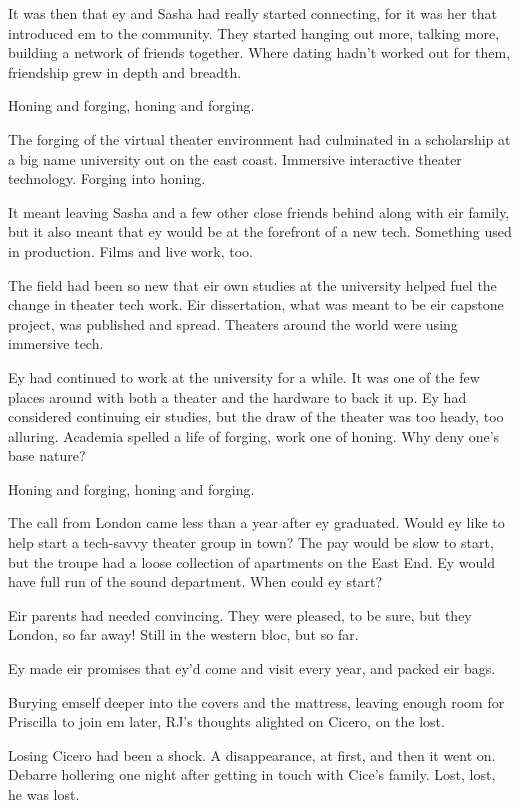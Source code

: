 It was then that ey and Sasha had really started connecting, for it was her that introduced em to the community. They started hanging out more, talking more, building a network of friends together. Where dating hadn't worked out for them, friendship grew in depth and breadth.

Honing and forging, honing and forging.

The forging of the virtual theater environment had culminated in a scholarship at a big name university out on the east coast. Immersive interactive theater technology. Forging into honing.

It meant leaving Sasha and a few other close friends behind along with eir family, but it also meant that ey would be at the forefront of a new tech. Something used in production. Films and live work, too.

The field had been so new that eir own studies at the university helped fuel the change in theater tech work. Eir dissertation, what was meant to be eir capstone project, was published and spread. Theaters around the world were using immersive tech.

Ey had continued to work at the university for a while. It was one of the few places around with both a theater and the hardware to back it up. Ey had considered continuing eir studies, but the draw of the theater was too heady, too alluring. Academia spelled a life of forging, work one of honing. Why deny one's base nature?

Honing and forging, honing and forging.

The call from London came less than a year after ey graduated. Would ey like to help start a tech-savvy theater group in town? The pay would be slow to start, but the troupe had a loose collection of apartments on the East End. Ey would have full run of the sound department. When could ey start?

Eir parents had needed convincing. They were pleased, to be sure, but they London, so far away! Still in the western bloc, but so far.

Ey made eir promises that ey'd come and visit every year, and packed eir bags.

Burying emself deeper into the covers and the mattress, leaving enough room for Priscilla to join em later, RJ's thoughts alighted on Cicero, on the lost.

Losing Cicero had been a shock. A disappearance, at first, and then it went on. Debarre hollering one night after getting in touch with Cice's family. Lost, lost, he was lost.

